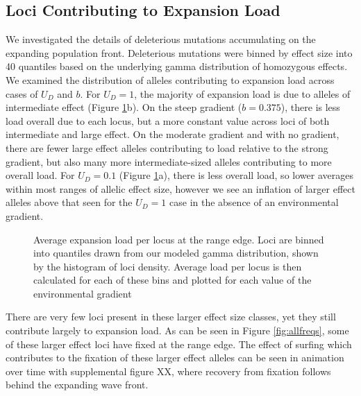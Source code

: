 \subsection*{Loci Contributing to Expansion Load}
We investigated the details of deleterious mutations accumulating on the expanding population front. Deleterious mutations were binned by effect size into 40 quantiles based on the underlying gamma distribution of homozygous effects. We examined the distribution of alleles contributing to expansion load across cases of $U_D$ and $b$. For $U_D = 1$, the majority of expansion load is due to alleles of intermediate effect (Figure \ref{fig:loci}b). On the steep gradient ($b = 0.375$), there is less load overall due to each locus, but a more constant value across loci of both intermediate and large effect. On the moderate gradient and with no gradient, there are fewer large effect alleles contributing to load relative to the strong gradient, but also many more intermediate-sized alleles contributing to more overall load. For $U_D = 0.1$ (Figure \ref{fig:loci}a), there is less overall load, so lower averages within most ranges of allelic effect size, however we see an inflation of larger effect alleles above that seen for the $U_D= 1$ case in the absence of an environmental gradient.

\begin{figure}[H]
\centering
{}
\caption[~- Average expansion load per locus.]{Average expansion load per locus at the range edge. Loci are binned into quantiles drawn from our modeled gamma distribution, shown by the histogram of loci density. Average load per locus is then calculated for each of these bins and plotted for each value of the environmental gradient}
\label{fig:loci}
\end{figure}

There are very few loci present in these larger effect size classes, yet they still contribute largely to expansion load. As can be seen in Figure \ref{fig:allfreqs}, some of these larger effect loci have fixed at the range edge. The effect of surfing which contributes to the fixation of these larger effect alleles can be seen in animation over time with supplemental figure \color{red}XX\color{black}, where recovery from fixation follows behind the expanding wave front.

